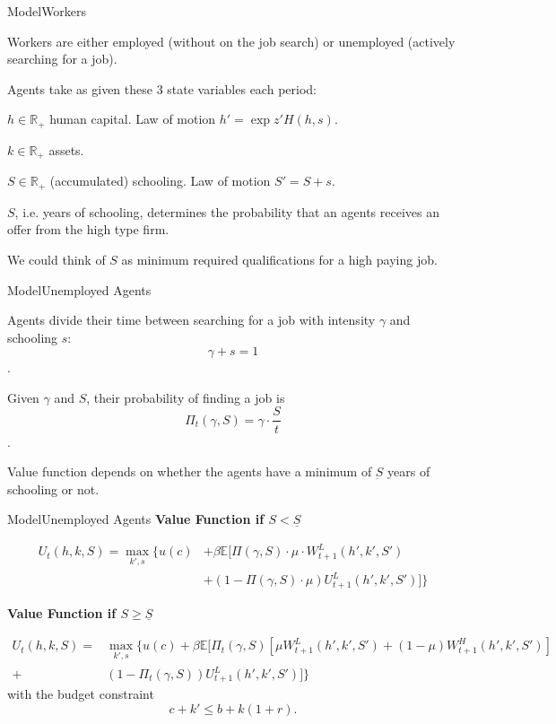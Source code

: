 \documentclass[notes, 10pt]{beamer}
\newenvironment{wideitemize}{\itemize\addtolength{\itemsep}{10pt}}{\enditemize}
\begin{document}
	\begin{frame}{Model}{Workers}
		\begin{wideitemize}
			\item Workers are either employed (without on the job search) or unemployed (actively searching for a job).
			\item Agents take as given these $3$ state variables each period:
			\begin{wideitemize}
				\item $h \in \mathbb{R}_+$ human capital. Law of motion $ h' = \exp{z'} H(h,s) $.
				\item $k \in \mathbb{R}_+$ assets.
				\item $S \in \mathbb{R}_+$ (accumulated) schooling. Law of motion $ S' = S + s $.
			\end{wideitemize}
			\item $S$, i.e. years of schooling, determines the probability that an agents receives an offer from the high type firm. 
			\begin{wideitemize}
				\item We could think of $S$ as minimum required qualifications for a high paying job.
			\end{wideitemize}
		\end{wideitemize}
	\end{frame}

	\begin{frame}{Model}{Unemployed Agents}
		\begin{wideitemize}
			\item Agents divide their time between searching for a job with intensity $\gamma$ and schooling $s$: $$ \gamma + s = 1$$.
			\item Given $\gamma$ and $S$, their probability of finding a job is $$ \Pi_t(\gamma, S) = \gamma \cdot \frac{S}{t} $$.
			\item Value function depends on whether the agents have a minimum of $\underbar{S}$ years of schooling or not.
		\end{wideitemize}
	\end{frame}

	\begin{frame}{Model}{Unemployed Agents}
		\textbf{Value Function if $S < \underline{S}$}

		\begin{align*}
			U_t(h,k,S) =  \max_{k',s} \biggl\{ u(c) &+ \beta\mathbb{E}\biggl[\Pi(\gamma, S) \cdot \mu \cdot W^L_{t+1}(h',k',S')\\
			&+ (1 - \Pi(\gamma, S) \cdot \mu)U^L_{t+1}(h',k',S')  \biggr] \biggr\}
		\end{align*}


		\textbf{Value Function if $S \geq \underline{S}$}

		\begin{align*}
			U_t(h,k,S) = &  \max_{k',s} \biggl\{ u(c) + \beta\mathbb{E}\biggl[\Pi_t(\gamma, S) \left[\mu W^L_{t+1}(h',k',S') + (1 - \mu) W^H_{t+1}(h',k',S') \right]  \\
				+ & (1 - \Pi_t(\gamma, S)) U^L_{t+1}(h',k',S')  \biggr] \biggr\}
		\end{align*}
		with the budget constraint \[  c + k' \leq b + k(1+r). \]
	\end{frame}
\end{document}
